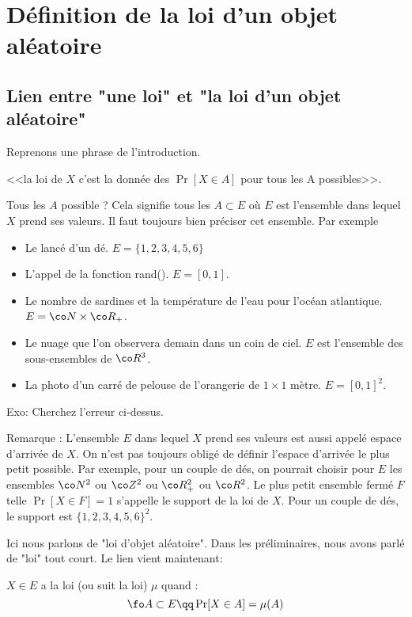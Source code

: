 \documentclass{article}
\begin{document}
\section{Définition de la loi d'un objet aléatoire}




\subsection{Lien entre "une loi" et "la loi d'un objet aléatoire"}

Reprenons une phrase de l'introduction.
\begin{center}
<<la loi de $X$ c'est la donnée des  $\Pr[X\in A]$ pour tous les A possibles>>. 
\end{center}
Tous les $A$ possible ? Cela signifie tous les $A \subset E$ où $E$ est l'ensemble dans lequel $X$ prend ses valeurs.   Il faut toujours bien préciser cet ensemble. Par exemple 
\begin{itemize}
\item Le lancé d'un dé.  $E=\{1,2,3,4,5,6\}$ 
\item L'appel de la fonction rand(). $E= [0,1]$. 
\item Le nombre de sardines et la température de l'eau pour l'océan atlantique. $E=\co N \times \co R_+$. 
\item Le nuage que l'on observera demain dans un coin de ciel. $E$ est l'ensemble des sous-ensembles de $\co R^3$. 
\item La photo d'un carré de pelouse de l'orangerie de $1\times 1$ mètre. $E=[0,1]^2$. 
\end{itemize}
Exo: Cherchez l'erreur ci-dessus. 

Remarque :  L'ensemble $E$ dans lequel $X$ prend ses valeurs est aussi appelé espace d'arrivée de $X$.  On n'est pas toujours obligé de définir l'espace d'arrivée le plus petit possible. Par exemple, pour un couple de dés, on pourrait  choisir pour $E$ les ensembles   $ \co N^2$ ou $\co Z^2$ ou $\co R_+^2$ ou $\co R^2$. Le plus petit ensemble fermé $F$  telle $\Pr[X\in F]=1$  s'appelle le support de la loi de $X$. Pour un couple de dés, le support est $\{1,2,3,4,5,6\}^2$.  


Ici nous parlons de "loi d'objet aléatoire". Dans les préliminaires, nous avons parlé de "loi" tout court. Le lien vient maintenant: 
\begin{definition}  $X\in E$ a la loi (ou suit la loi)  $\mu$ quand :
$$
\fo A\subset E  \qq \Pr[X\in A]=\mu(A)
$$
\end{definition}
\end{document}
